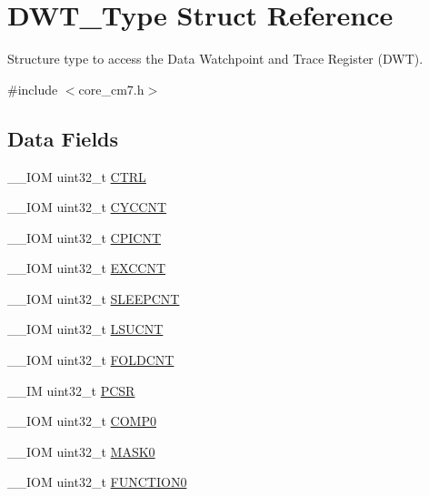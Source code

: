 \hypertarget{structDWT__Type}{}\section{D\+W\+T\+\_\+\+Type Struct Reference}
\label{structDWT__Type}


Structure type to access the Data Watchpoint and Trace Register (D\+WT).  




{\ttfamily \#include $<$core\+\_\+cm7.\+h$>$}

\subsection*{Data Fields}
\begin{DoxyCompactItemize}
\item 
\+\_\+\+\_\+\+I\+OM uint32\+\_\+t \mbox{\hyperlink{structDWT__Type_add790c53410023b3b581919bb681fe2a}{C\+T\+RL}}
\item 
\+\_\+\+\_\+\+I\+OM uint32\+\_\+t \mbox{\hyperlink{structDWT__Type_a102eaa529d9098242851cb57c52b42d9}{C\+Y\+C\+C\+NT}}
\item 
\+\_\+\+\_\+\+I\+OM uint32\+\_\+t \mbox{\hyperlink{structDWT__Type_a2c08096c82abe245c0fa97badc458154}{C\+P\+I\+C\+NT}}
\item 
\+\_\+\+\_\+\+I\+OM uint32\+\_\+t \mbox{\hyperlink{structDWT__Type_a9fe20c16c5167ca61486caf6832686d1}{E\+X\+C\+C\+NT}}
\item 
\+\_\+\+\_\+\+I\+OM uint32\+\_\+t \mbox{\hyperlink{structDWT__Type_a416a54e2084ce66e5ca74f152a5ecc70}{S\+L\+E\+E\+P\+C\+NT}}
\item 
\+\_\+\+\_\+\+I\+OM uint32\+\_\+t \mbox{\hyperlink{structDWT__Type_acc05d89bdb1b4fe2fa499920ec02d0b1}{L\+S\+U\+C\+NT}}
\item 
\+\_\+\+\_\+\+I\+OM uint32\+\_\+t \mbox{\hyperlink{structDWT__Type_a1cfc48384ebd8fd8fb7e5d955aae6c97}{F\+O\+L\+D\+C\+NT}}
\item 
\+\_\+\+\_\+\+IM uint32\+\_\+t \mbox{\hyperlink{structDWT__Type_a6353ca1d1ad9bc1be05d3b5632960113}{P\+C\+SR}}
\item 
\+\_\+\+\_\+\+I\+OM uint32\+\_\+t \mbox{\hyperlink{structDWT__Type_a61c2965af5bc0643f9af65620b0e67c9}{C\+O\+M\+P0}}
\item 
\+\_\+\+\_\+\+I\+OM uint32\+\_\+t \mbox{\hyperlink{structDWT__Type_a821eb5e71f340ec077efc064cfc567db}{M\+A\+S\+K0}}
\item 
\+\_\+\+\_\+\+I\+OM uint32\+\_\+t \mbox{\hyperlink{structDWT__Type_a579ae082f58a0317b7ef029b20f52889}{F\+U\+N\+C\+T\+I\+O\+N0}}

\end{DoxyCompactItemize}
